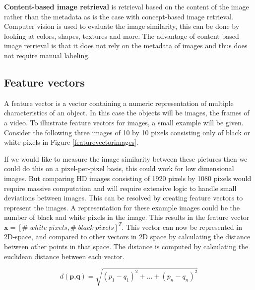 \documentclass{article}
\begin{document}
\textbf{Content-based image retrieval} is retrieval based on the content of the image rather than the metadata as is the case with concept-based image retrieval. Computer vision is used to evaluate the image similarity, this can be done by looking at colors, shapes, textures and more. The advantage of content based image retrieval is that it does not rely on the metadata of images and thus does not require manual labeling.

\subsection{Feature vectors}
A feature vector is a vector containing a numeric representation of multiple characteristics of an object. In this case the objects will be images, the frames of a video. To illustrate feature vectors for images, a small example will be given. Consider the following three images of 10 by 10 pixels consisting only of black or white pixels in Figure \ref{featurevectorimages}.

If we would like to measure the image similarity between these pictures then we could do this on a pixel-per-pixel basis, this could work for low dimensional images. But comparing HD images consisting of 1920 pixels by 1080 pixels would require massive computation and will require extensive logic to handle small deviations between images. This can be resolved by creating feature vectors to represent the images. A representation for these example images could be the number of black and white pixels in the image. This results in the feature vector $\textbf{x} = [\#\;white\;pixels, \#\;black\;pixels]^T$. This vector can now be represented in 2D-space, and compared to other vectors in 2D space by calculating the distance between other points in that space. The distance is computed by calculating the euclidean distance between each vector.

\[d(\textbf{p,q}) = \sqrt{(p_1 - q_1)^2 + \dots + (p_n - q_n)^2} \]
\end{document}
